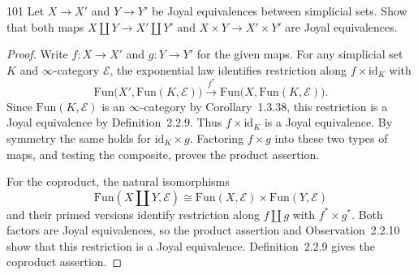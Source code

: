 \begin{exercise}{101}
Let $X\to X'$ and $Y\to Y'$ be Joyal equivalences between simplicial sets.
Show that both maps $X\amalg Y\to X'\amalg Y'$ and
$X\times Y\to X'\times Y'$ are Joyal equivalences.

\begin{proof}
Write $f\colon X\to X'$ and $g\colon Y\to Y'$ for the given maps.
For any simplicial set $K$ and $\infty$-category $\mathcal E$, the
exponential law identifies restriction along $f\times\mathrm{id}_K$ with
\[
 \mathrm{Fun}\bigl(X',\mathrm{Fun}(K,\mathcal E)\bigr)
 \xrightarrow{f^*}
 \mathrm{Fun}\bigl(X,\mathrm{Fun}(K,\mathcal E)\bigr).
\]
Since $\mathrm{Fun}(K,\mathcal E)$ is an $\infty$-category by
Corollary~1.3.38, this restriction is a Joyal equivalence by
Definition~2.2.9. Thus $f\times\mathrm{id}_K$ is a Joyal equivalence.
By symmetry the same holds for $\mathrm{id}_K\times g$.
Factoring $f\times g$ into these two types of maps, and testing the
composite, proves the product assertion.

For the coproduct, the natural isomorphisms
\[
 \mathrm{Fun}(X\amalg Y,\mathcal E)
 \cong\mathrm{Fun}(X,\mathcal E)\times\mathrm{Fun}(Y,\mathcal E)
\]
and their primed versions identify restriction along $f\amalg g$ with
$f^*\times g^*$. Both factors are Joyal equivalences, so the product
assertion and Observation~2.2.10 show that this restriction is a Joyal
equivalence. Definition~2.2.9 gives the coproduct assertion.
\end{proof}
\end{exercise}
